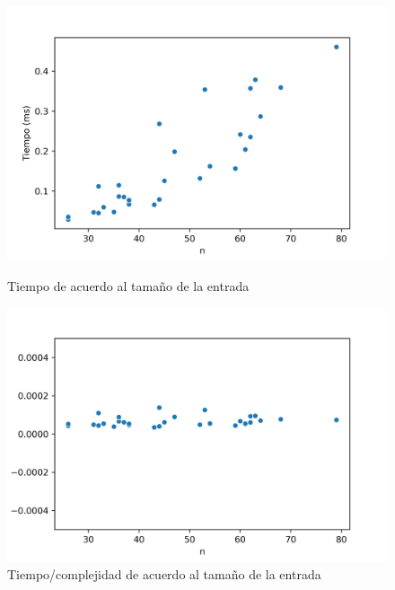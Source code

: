 \begin{figure}[H]
	\centering
	\begin{minipage}{0.44\textwidth}
		\centering
		\includegraphics[width=1\textwidth]{images/kmeans/tiempokmeans}
		\caption{\footnotesize Tiempo de acuerdo al tamaño de la entrada}
		\label{fig:kmeans-tiempos}
	\end{minipage}%
	\hspace{0.03\textwidth}
	\begin{minipage}{0.45\textwidth}
		\centering
		\includegraphics[width=1\textwidth]{images/kmeans/kmeanscte}
		\caption{\footnotesize Tiempo/complejidad de acuerdo al tamaño de la entrada}
		\label{fig:kmeans-cte}
	\end{minipage}%
\end{figure}

